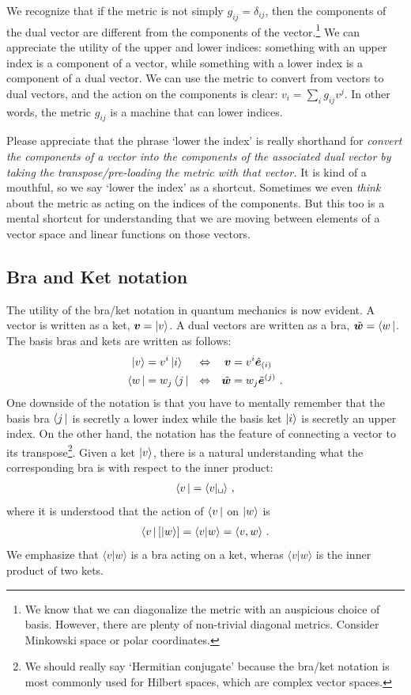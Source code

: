 \documentclass[
  11pt,
	colorful,
	raggedright,
]{tufte-style-thesis-flip}
\begin{document}
We recognize that if the metric is not simply $g_{ij} = \delta_{ij}$, then the components of the dual vector are different from the components of the vector.\footnote{We know that we can diagonalize the metric with an auspicious choice of basis. However, there are plenty of non-trivial diagonal metrics. Consider Minkowski space or polar coordinates.} We can appreciate the utility of the upper and lower indices: something with an upper index is a component of a vector, while something with a lower index is a component of a dual vector. We can use the metric to convert from vectors to dual vectors, and the action on the components is clear: $v_i = \sum_i g_{ij}v^j$. In other words, the metric $g_{ij}$ is a machine that can lower indices.

Please appreciate that the phrase `lower the index' is really shorthand for \emph{convert the components of a vector into the components of the associated dual vector by taking the transpose/pre-loading the metric with that vector.} It is kind of a mouthful, so we say `lower the index' as a shortcut. Sometimes we even \emph{think} about the metric as acting on the indices of the components. But this too is a mental shortcut for understanding that we are moving between elements of a vector space and linear functions on those vectors.

\subsection{Bra and Ket notation}

The utility of the bra/ket notation in quantum mechanics is now evident. A vector is written as a ket, $\boldsymbol{v} = \left|v\right\rangle$. A dual vectors are written as a bra, $\tilde{\boldsymbol{w}} = \left\langle w\,\right|$. The basis bras and kets are written as follows:
\begin{align}
  \left|v\right\rangle &= v^i\left|i\right\rangle &\Leftrightarrow&&
  \boldsymbol{v} &= v^i \hat{\boldsymbol{e}}_{(i)}
  \\
  \left\langle w\,\right| &= w_j\left\langle j\,\right| &\Leftrightarrow&&
  \tilde{\boldsymbol{w}} &= w_j \tilde{\boldsymbol{e}}^{(j)} \ .
\end{align}
One downside of the notation is that you have to mentally remember that the basis bra $\left\langle j\,\right|$ is secretly a lower index while the basis ket $\left|i\right\rangle$ is secretly an upper index. On the other hand, the notation has the feature of connecting a vector to its transpose\footnote{We should really say `Hermitian conjugate' because the bra/ket notation is most commonly used for Hilbert spaces, which are complex vector spaces.}. Given a ket $\left|v\right\rangle$, there is a natural understanding what the corresponding bra is with respect to the inner product:
\begin{align}
  \bra{v} = \langle v | \texttt{\textvisiblespace} \rangle \ ,
\end{align}
where it is understood that the action of $\left\langle v\,\right|$ on $\left|w\right\rangle$ is
\begin{align}
  \left\langle v\,\right|\left[\left|w\right\rangle\right] = \langle v | w\rangle = \langle v, w \rangle \ .
\end{align}
We emphasize that $\langle v | w\rangle$ is a bra acting on a ket, wheras $\langle v | w\rangle$ is the inner product of two kets.
\end{document}
